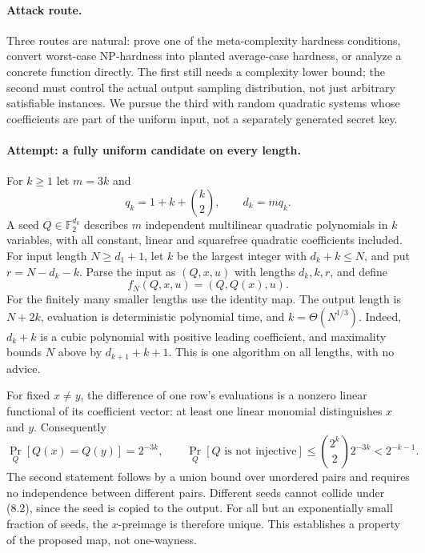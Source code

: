 \documentclass[11pt,a4paper]{article}
\newcommand{\F}{\mathbb{F}}
\begin{document}
\paragraph{Attack route.}
Three routes are natural: prove one of the meta-complexity hardness
conditions, convert worst-case NP-hardness into planted average-case
hardness, or analyze a concrete function directly. The first still needs
a complexity lower bound; the second must control the actual output
sampling distribution, not just arbitrary satisfiable instances.
We pursue the third with random quadratic systems whose coefficients
are part of the uniform input, not a separately generated secret key.

\paragraph{Attempt: a fully uniform candidate on every length.}
For $k\ge1$ let $m=3k$ and
\[
 q_k=1+k+\binom{k}{2},\qquad d_k=mq_k.
 \tag{8.1}
\]
A seed $Q\in\F_2^{d_k}$ describes $m$ independent multilinear quadratic
polynomials in $k$ variables, with all constant, linear and squarefree
quadratic coefficients included. For input length $N\ge d_1+1$, let $k$
be the largest integer with $d_k+k\le N$, and put $r=N-d_k-k$.
Parse the input as $(Q,x,u)$ with lengths $d_k,k,r$, and define
\[
 f_N(Q,x,u)=(Q,Q(x),u).
 \tag{8.2}
\]
For the finitely many smaller lengths use the identity map.
The output length is $N+2k$, evaluation is deterministic polynomial
time, and $k=\Theta(N^{1/3})$. Indeed, $d_k+k$ is a cubic polynomial
with positive leading coefficient, and maximality bounds $N$ above by
$d_{k+1}+k+1$. This is one algorithm on all lengths, with no advice.

For fixed $x\ne y$, the difference of one row's evaluations is a nonzero
linear functional of its coefficient vector: at least one linear
monomial distinguishes $x$ and $y$. Consequently
\[
 \Pr_Q[Q(x)=Q(y)]=2^{-3k},\qquad
 \Pr_Q[Q\text{ is not injective}]\le
 \binom{2^k}{2}2^{-3k}<2^{-k-1}.
 \tag{8.3}
\]
The second statement follows by a union bound over unordered pairs and
requires no independence between different pairs. Different seeds cannot
collide under (8.2), since the seed is copied to the output. For all but
an exponentially small fraction of seeds, the $x$-preimage is therefore
unique. This establishes a property of the proposed map, not one-wayness.
\end{document}
